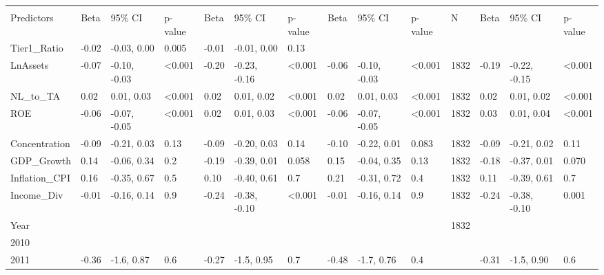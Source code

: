 \documentclass{article}
\begin{document}
\begin{tabu} to 
\hline
{} &  &  &  &  \\
   
Predictors & Beta & 95\% CI & p-value & Beta & 95\% CI & p-value & Beta & 95\% CI & p-value & N & Beta & 95\% CI & p-value\\
\hline
Tier1\_Ratio & -0.02 & -0.03, 0.00 & 0.005 & -0.01 & -0.01, 0.00 & 0.13 &  &  &  &  &  &  & \\
\hline
LnAssets & -0.07 & -0.10, -0.03 & <0.001 & -0.20 & -0.23, -0.16 & <0.001 & -0.06 & -0.10, -0.03 & <0.001 & 1832 & -0.19 & -0.22, -0.15 & <0.001\\
\hline
NL\_to\_TA & 0.02 & 0.01, 0.03 & <0.001 & 0.02 & 0.01, 0.02 & <0.001 & 0.02 & 0.01, 0.03 & <0.001 & 1832 & 0.02 & 0.01, 0.02 & <0.001\\
\hline
ROE & -0.06 & -0.07, -0.05 & <0.001 & 0.02 & 0.01, 0.03 & <0.001 & -0.06 & -0.07, -0.05 & <0.001 & 1832 & 0.03 & 0.01, 0.04 & <0.001\\
\hline
Concentration & -0.09 & -0.21, 0.03 & 0.13 & -0.09 & -0.20, 0.03 & 0.14 & -0.10 & -0.22, 0.01 & 0.083 & 1832 & -0.09 & -0.21, 0.02 & 0.11\\
\hline
GDP\_Growth & 0.14 & -0.06, 0.34 & 0.2 & -0.19 & -0.39, 0.01 & 0.058 & 0.15 & -0.04, 0.35 & 0.13 & 1832 & -0.18 & -0.37, 0.01 & 0.070\\
\hline
Inflation\_CPI & 0.16 & -0.35, 0.67 & 0.5 & 0.10 & -0.40, 0.61 & 0.7 & 0.21 & -0.31, 0.72 & 0.4 & 1832 & 0.11 & -0.39, 0.61 & 0.7\\
\hline
Income\_Div & -0.01 & -0.16, 0.14 & 0.9 & -0.24 & -0.38, -0.10 & <0.001 & -0.01 & -0.16, 0.14 & 0.9 & 1832 & -0.24 & -0.38, -0.10 & 0.001\\
\hline
Year &  &  &  &  &  &  &  &  &  & 1832 &  &  & \\
\hline
\hspace{1em}2010 &  &  &  &  &  &  &  &  &  &  &  &  & \\
\hline
\hspace{1em}2011 & -0.36 & -1.6, 0.87 & 0.6 & -0.27 & -1.5, 0.95 & 0.7 & -0.48 & -1.7, 0.76 & 0.4 &  & -0.31 & -1.5, 0.90 & 0.6\\

\end{tabu}
\end{document}

